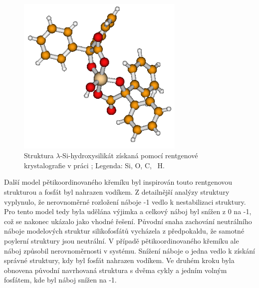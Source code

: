 \documentclass[
digital, %
table,   %
lof,     %
lot,     %
oneside,
]{fithesis3}
\begin{document}
\begin{figure}\begin{minipage}{\textwidth}
\begin{center}
\includegraphics[width=8cm]{rtg_5_koordinace.png}
\caption{Struktura $\lambda$-Si-hydroxysilikát získaná pomocí rentgenové krystalografie v práci \cite{rtg_5};  Legenda:  Si,  O,  C, ~H.}
\label{rtg_5}
\end{center}\end{minipage}
\end{figure}
Další model pětikoordinovaného křemíku byl inspirován touto rentgenovou strukturou a fosfát byl nahrazen vodíkem. Z detailnější analýzy struktury vyplynulo, že nerovnoměrné rozložení náboje -1 vedlo k nestabilizaci struktury. Pro tento model tedy byla udělána výjimka a celkový náboj byl snížen z 0 na -1, což se nakonec ukázalo jako vhodné řešení. Původní snaha zachování neutrálního náboje modelových struktur silikofosfátů vycházela z předpokaldu, že samotné poylerní struktury jsou neutrální. V případě pětikoordinovaného křemíku ale náboj způsobil nerovnoměrnosti v systému. Snížení náboje o jedna vedlo k získání správné struktury, kdy byl fosfát nahrazen vodíkem. Ve druhém kroku byla obnovena původní navrhovaná struktura s dvěma cykly a jedním volným fosfátem, kde byl náboj snížen na -1.\\
\end{document}

